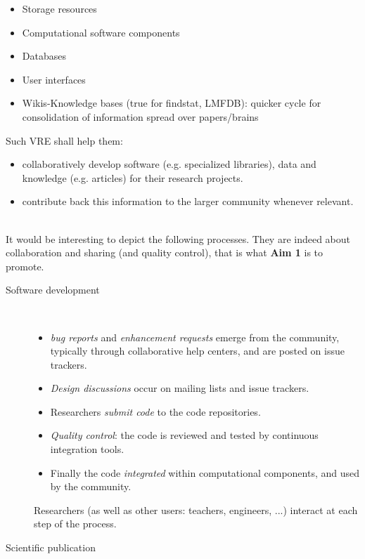 {\begin{description}
\begin{itemize}
\begin{itemize}
      \item Storage resources
      \item Computational software components
      \item Databases
      \item User interfaces
      \item Wikis-Knowledge bases (true for findstat, LMFDB): quicker
        cycle for consolidation of information spread over
        papers/brains
      \end{itemize}
      Such VRE shall help them:
      \begin{itemize}
      \item collaboratively develop software (e.g. specialized
        libraries), data and knowledge (e.g. articles) for their
        research projects.
      \item contribute back this information to the larger community
        whenever relevant.
      \end{itemize}
    \end{itemize}
  \item[Processes:]\ \\
    It would be interesting to depict the following processes. They
    are indeed about collaboration and sharing (and quality control),
    that is what \textbf{Aim 1} is to promote.
    \begin{description}
    \item[Software development]\ 
      \begin{itemize}
      \item \emph{bug reports} and \emph{enhancement requests} emerge
        from the community, typically through collaborative help
        centers, and are posted on issue trackers.
      \item \emph{Design discussions} occur on mailing lists and issue
        trackers.
      \item Researchers \emph{submit code} to the code repositories.
      \item \emph{Quality control}: the code is reviewed and
        tested by continuous integration tools.
      \item Finally the code \emph{integrated} within computational
        components, and used by the community.
      \end{itemize}
      Researchers (as well as other users: teachers, engineers, ...)
      interact at each step of the process.
    \item[Scientific publication]\ 
      \begin{itemize}

\end{itemize}
\end{description}
\end{description}}
